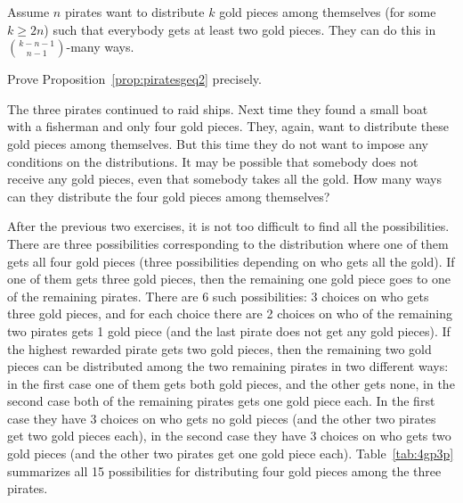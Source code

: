 \begin{proposition}\label{prop:piratesgeq2}
Assume $n$ pirates want to distribute $k$ gold pieces among themselves (for some $k\geq 2n$) such that everybody gets at least two gold pieces. 
They can do this in $\binom{k-n-1}{n-1}$-many ways. 
\end{proposition}

\begin{exercise}\label{ex:piratesgeq2}
Prove Proposition~\ref{prop:piratesgeq2} precisely. 
\end{exercise}

The three pirates continued to raid ships. 
Next time they found a small boat with a fisherman and only four gold pieces. 
They, again, want to distribute these gold pieces among themselves. 
But this time they do not want to impose any conditions on the distributions. 
It may be possible that somebody does not receive any gold pieces, 
even that somebody takes all the gold. 
How many ways can they distribute the four gold pieces among themselves? 

After the previous two exercises, 
it is not too difficult to find all the possibilities. 
There are three possibilities corresponding to the distribution where one of them gets all four gold pieces 
(three possibilities depending on who gets all the gold). 
If one of them gets three gold pieces, 
then the remaining one gold piece goes to one of the remaining pirates. 
There are 6 such possibilities: 
3 choices on who gets three gold pieces, 
and for each choice there are 2 choices on who of the remaining two pirates gets 1 gold piece 
(and the last pirate does not get any gold pieces). 
If the highest rewarded pirate gets two gold pieces, 
then the remaining two gold pieces can be distributed among the two remaining pirates in two different ways: 
in the first case one of them gets both gold pieces, and the other gets none, 
in the second case both of the remaining pirates gets one gold piece each. 
In the first case they have 3 choices on who gets no gold pieces 
(and the other two pirates get two gold pieces each), 
in the second case they have 3 choices on who gets two gold pieces 
(and the other two pirates get one gold piece each). 
Table~\ref{tab:4gp3p} summarizes all 15 possibilities for distributing four gold pieces among the three pirates. 

